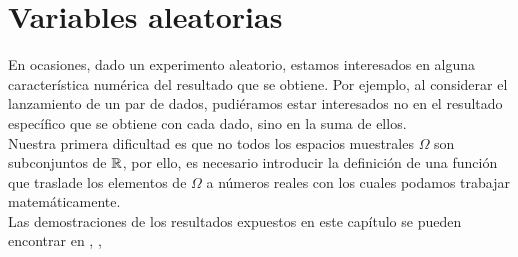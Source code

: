 \section{Variables aleatorias}
En ocasiones, dado un experimento aleatorio, estamos interesados en alguna característica numérica del resultado que se obtiene. Por ejemplo, al considerar el lanzamiento de un par de dados, pudiéramos estar interesados no en el resultado específico que se obtiene con cada dado, sino en la suma de ellos.\\
Nuestra primera dificultad es que no todos los espacios muestrales $\Omega$ son subconjuntos de ${\mathbb{R}}$, por ello, es necesario introducir la definición de una función que traslade los elementos de $\Omega$ a números reales con los cuales podamos trabajar matemáticamente.\\
Las demostraciones de los resultados expuestos en este capítulo se pueden encontrar en \cite{intro-probabilidad}, \cite{Feller},\cite{Rincon1} \cite{Rincon2}
\begin{comment}
\begin{Def}
El $\sigma-$álgebra de Borel en $\R$ denotado por $\mathscr{B}(\R)$ es
$$\mathscr{B}(\R)=\sigma(\{(a,\thinspace b)\subset\R:a\leq b\})$$
\end{Def}
\begin{Prop}
\textbf{ }\\
\begin{enumerate}
    \item Todo intervalo de $\R$ es un booreliano.
    \item Los subconjuntos cerrados y abiertos de $\R$ son borelianos
\end{enumerate}
\end{Prop}
\begin{Def}
Una función $\phi:\R^n\rightarrow\R^m$ es llamada boreliana si $\phi^{-1}(B)$ es un conjunto boreliano de $R^{-1}$ para todo boreliano B de $\R$.
\end{Def}
Recuérdese que si $\phi:\R^n\rightarrow\R^m$ es cualquier función, se cumple que $\phi^{-1}(B^c)=[\phi^{-1}(B)]^c$
 $\phi^{-1}(\bigcup_{\lambda}B_{\lambda})=\bigcup_{\lambda}\phi^{-1}(B_\lambda)$. Esto
implica que $\{B\subset \R^m: \phi^{-1}(B)\in B(\R^n)\}$ es un $\sigma$-álgebra de subconjuntos de $R^m$ , de manera que, para demostrar que una
cierta función f es boreliana, basta con probar que $\phi^{-1}(B)$ es un conjunto boreliano de $\R^n$ para cualquier elemento B abierto (o cualquier elemento B de una familia de generadores de los borelianos de $\R^m$).
Con base de esta idea, se pueden demostrar las siguientes proposiciones.
\begin{Prop}
$\phi:\R^n\rightarrow\R^m$,  $g:\R^m\rightarrow\R^p$ son borelianos, entonces $g\circ\phi$ es boreliano
\end{Prop}
\begin{Prop} Si $\phi:\R^n\rightarrow\R^m$ es continua, entonces es boreliana.
\end{Prop}
\end{comment}

